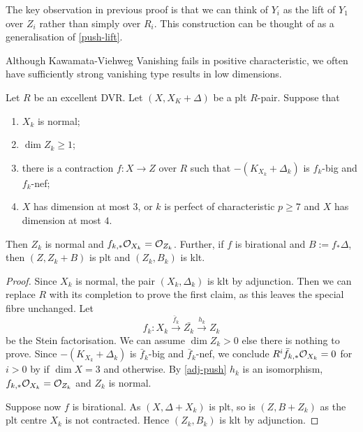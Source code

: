 \begin{remark}
	The key observation in previous proof is that we can think of $Y_{i}$ as the lift of $Y_{1}$ over $Z_{i}$ rather than simply over $R_{i}$. This construction can be thought of as a generalisation of \autoref{push-lift}.
\end{remark}

Although Kawamata-Viehweg Vanishing fails in positive characteristic, we often have sufficiently strong vanishing type results in low dimensions.

\begin{lemma}\label{invAdj2}
	Let $R$ be an excellent DVR.
	Let $(X,X_{K}+\Delta)$ be a plt $R$-pair. Suppose that
	\begin{enumerate}
		\item $X_k$ is normal;
		\item $\dim Z_{k} \geq 1$;
		\item there is a contraction $f \colon X \to Z$ over $R$ such that $-(K_{X_{k}}+\Delta_{k})$ is $f_{k}$-big and $f_k$-nef;
		\item $X$ has dimension at most $3$, or $k$ is perfect of characteristic $p\geq 7$ and $X$ has dimension at most $4$.
	\end{enumerate}  
	Then $Z_{k}$ is normal and $f_{k,*}\ox[X_{k}]=\ox[Z_{k}]$. Further, if $f$ is birational and $B:=f_{*}\Delta$, then $(Z, Z_k+B)$ is plt and $(Z_{k},B_{k})$ is klt.
\end{lemma}

\begin{proof}
	Since $X_{k}$ is normal, the pair $(X_{k},\Delta_{k})$ is klt by adjunction. Then we can replace $R$ with its completion to prove the first claim, as this leaves the special fibre unchanged.	
	Let $$f_{k}\colon X_{k} \xrightarrow{\bar{f}_{k}} \bar{Z_k} \xrightarrow{h_k} Z_{k}$$ be the Stein factorisation. We can assume $\dim Z_{k} > 0$ else there is nothing to prove.
	Since $-(K_{X_{k}}+\Delta_{k})$ is $\bar{f}_{k}$-big and $\bar{f}_{k}$-nef, we conclude $R^{i}\bar{f}_{k,*}\ox[X_{k}]=0$ for $i> 0$ by \cite[Theorem 3.3]{tanaka2018minimal} if $\dim X =3$ and \cite[Theorem 25]{bernasconi2020vanishing} otherwise.
	By \autoref{adj-push} $h_k$ is an isomorphism, $f_{k,*}\ox[X_{k}]=\ox[Z_{k}]$ and $Z_{k}$ is normal.
	
	Suppose now $f$ is birational. As $(X,\Delta+X_k)$ is plt, so is $(Z,B+Z_k)$ as the plt centre $X_k$ is not contracted. Hence $(Z_k,B_k)$ is klt by adjunction.			
\end{proof}

